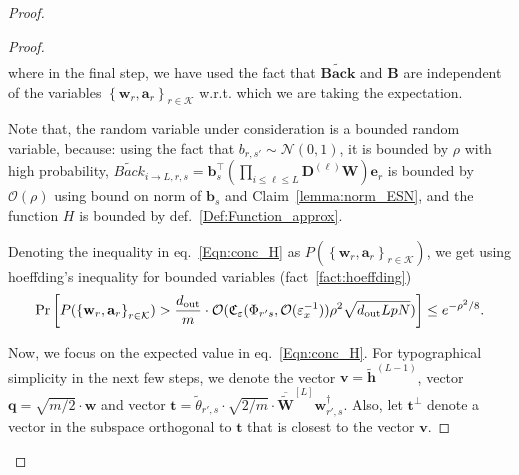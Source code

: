 \begin{claim}
\begin{proof}
\begin{proof}
\begin{align}
					\end{align}
					\endgroup
					where in the final step, we have used the fact that $\widetilde{\mathbf{Back}}$ and $\mathbf{B}$ are independent of  the variables $\left\{ \mathbf{w}_r, \mathbf{a}_r \right\}_{r \in \mathcal{K}}$ w.r.t. which we are taking the expectation.
					
					Note that, the random variable under consideration is a bounded random variable, because: using the fact that $b_{r, s'} \sim \mathcal{N}(0, 1)$, it is bounded by $\rho$ with high probability, $\widetilde{Back}_{i \to L, r, s} = \mathbf{b}_s^{\top} (\prod_{i \le \ell \le L} \mathbf{D}^{(\ell)} \mathbf{W}) \mathbf{e}_r$ is bounded by $\mathcal{O}(\rho)$ using bound on norm of $\mathbf{b}_s$ and Claim~\ref{lemma:norm_ESN}, and the function $H$ is bounded by def.~\ref{Def:Function_approx}.
					\iffalse
					\begin{align*}
						\abs{\frac{\dout }{m} \sum_{i=1}^{L}  \sum_{s' \in [\dout ]} \sum_{r' \in [p]} b_{r, s'} b_{r', s'}^{\dagger} \widetilde{\mathbf{Back}}_{i \to L, r, s}  H_{r', s}\Big(\widetilde{\theta}_{r', s} \langle \mathbf{w}_{r}, \overline{\widetilde{\mathbf{W}}}^{[L]} \mathbf{w}_{r', s}^{\dagger}\rangle , \sqrt{m/2} a_{r, d}\Big) \mathbb{I}_{\mathbf{w}_r^{\top} \widetilde{\mathbf{h}}^{(L-1)} + \mathbf{a}_r^{\top} \mathbf{x}^{(L)} \ge 0}} \le \mathcal{O}(\rho^2 \mathfrak{C}_{\varepsilon}(\Phi, \mathcal{O}(\varepsilon_x^{-1})))
					\end{align*}
					\fi
					Denoting the inequality in eq.~\ref{Eqn:conc_H} as 
					$P(\left\{ \mathbf{w}_r, \mathbf{a}_r \right\}_{r \in \mathcal{K}})$, we get using hoeffding's inequality for bounded variables (fact~\ref{fact:hoeffding})
					\begin{equation*}
						\Pr \left[ P(\left\{ \mathbf{w}_r, \mathbf{a}_r \right\}_{r \in \mathcal{K}}) > \frac{d_{\mathrm{out}} }{m} \cdot  \mathcal{O}(\mathfrak{C}_{\varepsilon}(\Phi_{r' s}, \mathcal{O}(\varepsilon_x^{-1})) \rho^2 \sqrt{d_{\mathrm{out}} LpN}) \right] \le e^{-\rho^2/8}.
					\end{equation*}
					
					Now, we focus on the expected value in eq.~\ref{Eqn:conc_H}.
					For typographical simplicity in the next few steps, we denote the vector $\mathbf{v} =  \widetilde{\mathbf{h}}^{(L-1)}$, vector $\mathbf{q} = \sqrt{m/2} \cdot \mathbf{w}$ and vector $\mathbf{t}=\widetilde{\theta}_{r', s} \cdot \sqrt{2/m} \cdot \overline{\widetilde{\mathbf{W}}}^{[L]} \mathbf{w}_{r', s}^{\dagger}$. Also, let $\mathbf{t}^{\perp}$ denote a vector in the subspace orthogonal to $\mathbf{t}$ that is closest to the vector $\mathbf{v}$.
					

\end{proof}
\end{proof}
\end{claim}
